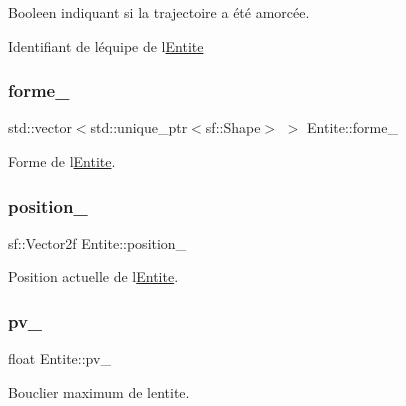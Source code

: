Booleen indiquant si la trajectoire a été amorcée. 

Identifiant de l\textquotesingle{}équipe de l\textquotesingle{}\hyperlink{class_entite}{Entite} \mbox{\label{class_entite_aa6bbda9a40f701f273c344406a6f5122}} 
\subsubsection{\texorpdfstring{forme\+\_\+}{forme\_}}
{\footnotesize\ttfamily std\+::vector$<$std\+::unique\+\_\+ptr$<$sf\+::\+Shape$>$ $>$ Entite\+::forme\+\_\+\hspace{0.3cm}{\ttfamily [protected]}}



Forme de l\textquotesingle{}\hyperlink{class_entite}{Entite}. 

\mbox{\label{class_entite_abbd554c4f122159a73cb113cc8de3860}} 
\subsubsection{\texorpdfstring{position\+\_\+}{position\_}}
{\footnotesize\ttfamily sf\+::\+Vector2f Entite\+::position\+\_\+\hspace{0.3cm}{\ttfamily [protected]}}



Position actuelle de l\textquotesingle{}\hyperlink{class_entite}{Entite}. 

\mbox{\label{class_entite_a85b09d98caf443622a546345db8828b8}} 
\subsubsection{\texorpdfstring{pv\+\_\+}{pv\_}}
{\footnotesize\ttfamily float Entite\+::pv\+\_\+\hspace{0.3cm}{\ttfamily [protected]}}



Bouclier maximum de l\textquotesingle{}entite. 

\mbox{\label{class_entite_a1346c3ad97658a42d327ab4928d6639c}} 
